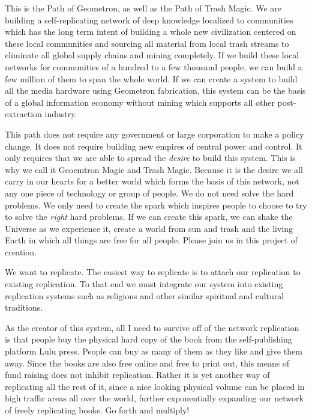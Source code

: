 This is the Path of Geometron, as well as the Path of Trash Magic. We
are building a self-replicating network of deep knowledge localized to
communities which has the long term intent of building a whole new
civilization centered on these local communities and sourcing all
material from local trash streams to eliminate all global supply chains
and mining completely. If we build these local networks for communities
of a hundred to a few thousand people, we can build a few million of
them to span the whole world. If we can create a system to build all the
media hardware using Geometron fabrication, this system can be the basis
of a global information economy without mining which supports all other
post-extraction industry.

This path does not require any government or large corporation to make a
policy change. It does not require building new empires of central power
and control. It only requires that we are able to spread the
\emph{desire} to build this system. This is why we call it Geoemtron
Magic and Trash Magic. Because it is the desire we all carry in our
hearts for a better world which forms the basis of this network, not any
one piece of technology or group of people. We do not need solve the
hard problems. We only need to create the spark which inspires people to
choose to try to solve the \emph{right} hard problems. If we can create
this spark, we can shake the Universe as we experience it, create a
world from sun and trash and the living Earth in which all things are
free for all people. Please join us in this project of creation.

We want to replicate. The easiest way to replicate is to attach our
replication to existing replication. To that end we must integrate our
system into existing replication systems such as religions and other
similar spiritual and cultural traditions.

As the creator of this system, all I need to survive off of the network
replication is that people buy the physical hard copy of the book from
the self-publishing platform Lulu press. People can buy as many of them
as they like and give them away. Since the books are also free online
and free to print out, this means of fund raising does not inhibit
replication. Rather it is yet another way of replicating all the rest of
it, since a nice looking physical volume can be placed in high traffic
areas all over the world, further exponentially expanding our network of
freely replicating books. Go forth and multiply!
